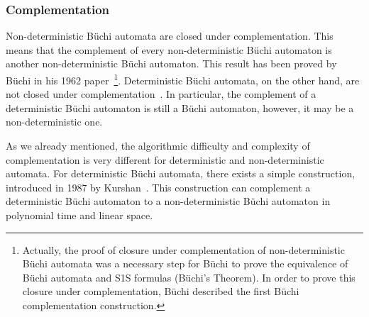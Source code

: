 

\subsubsection{Complementation}
Non-deterministic Büchi automata are closed under complementation. This means that the complement of every non-deterministic Büchi automaton is another non-deterministic Büchi automaton. This result has been proved by Büchi in his 1962 paper~\cite{buchi1960decision}\footnote{Actually, the proof of closure under complementation of non-deterministic Büchi automata was a necessary step for Büchi to prove the equivalence of Büchi automata and S1S formulas (Büchi's Theorem). In order to prove this closure under complementation, Büchi described the first Büchi complementation construction.}. Deterministic Büchi automata, on the other hand, are not closed under complementation~\cite{Thomas:1991}. In particular, the complement of a deterministic Büchi automaton is still a Büchi automaton, however, it may be a non-deterministic one.

As we already mentioned, the algorithmic difficulty and complexity of complementation is very different for deterministic and non-deterministic automata. For deterministic Büchi automata, there exists a simple construction, introduced in 1987 by Kurshan~\cite{Kurshan198759}. This construction can complement a deterministic Büchi automaton to a non-deterministic Büchi automaton in polynomial time and linear space.

